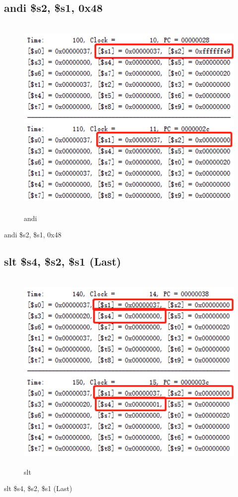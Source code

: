 \documentclass{article}
\begin{document}
\subsection{andi \$s2, \$s1, 0x48}
\begin{figure}[H]
    \centering
    \includegraphics[height = 10cm,width = 13cm]{andi.png}
    \caption{andi}
    \label{fig:my_label}
\end{figure}
andi \$s2, \$s1, 0x48

\subsection{slt \$s4, \$s2, \$s1 (Last)}
\begin{figure}[H]
    \centering
    \includegraphics[height = 10cm,width = 13cm]{slt.png}
    \caption{slt}
    \label{fig:my_label}
\end{figure}
slt \$s4, \$s2, \$s1 (Last)
\end{document}
